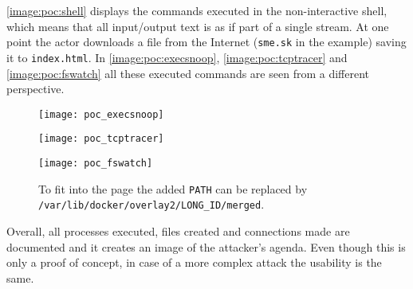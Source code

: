 \autoref{image:poc:shell} displays the commands executed in the non-interactive shell, which means that all input/output text is as if part of a single stream. At one point the actor downloads a file from the Internet (\texttt{sme.sk} in the example) saving it to \texttt{index.html}. In \autoref{image:poc:execsnoop}, \autoref{image:poc:tcptracer} and \autoref{image:poc:fswatch} all these executed commands are seen from a different perspective.

\begin{figure}[h]
	\centering
	\texttt{[image: poc\_execsnoop]}
	\caption{}
	\label{image:poc:execsnoop}
\end{figure}

\begin{figure}[h]
	\centering
	\texttt{[image: poc\_tcptracer]}
	\caption{}
	\label{image:poc:tcptracer}
\end{figure}

\begin{figure}[h]
	\centering
	\texttt{[image: poc\_fswatch]}
	\caption{To fit into the page the added \texttt{PATH} can be replaced by \texttt{/var/lib/docker/overlay2/LONG\_ID/merged}.}
	\label{image:poc:fswatch}
\end{figure}

Overall, all processes executed, files created and connections made are documented and it creates an image of the attacker's agenda. Even though this is only a proof of concept, in case of a more complex attack the usability is the same.

